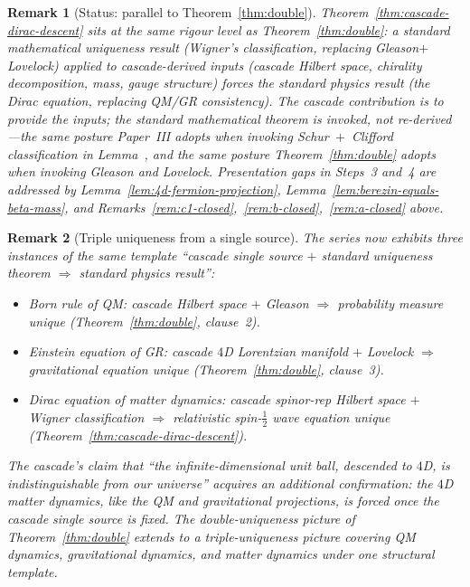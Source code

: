 \documentclass[12pt,a4paper]{article}
\newtheorem*{remark}{Remark}
\begin{document}
\begin{remark}[Status: parallel to Theorem~\ref{thm:double}]
\label{rem:cascade-dirac-status}
Theorem~\ref{thm:cascade-dirac-descent} sits at the same rigour
level as Theorem~\ref{thm:double}: a standard mathematical
uniqueness result (Wigner's classification, replacing
Gleason$+$Lovelock) applied to cascade-derived inputs (cascade
Hilbert space, chirality decomposition, mass, gauge structure)
forces the standard physics result (the Dirac equation, replacing
QM/GR consistency). The cascade contribution is to provide the
inputs; the standard mathematical theorem is invoked, not
re-derived---the same posture Paper~III adopts when invoking
Schur~$+$~Clifford classification in
Lemma~, and the same posture
Theorem~\ref{thm:double} adopts when invoking Gleason and Lovelock.
Presentation gaps in Steps~3 and~4 are addressed by
Lemma~\ref{lem:4d-fermion-projection},
Lemma~\ref{lem:berezin-equals-beta-mass}, and
Remarks~\ref{rem:c1-closed},~\ref{rem:b-closed},~\ref{rem:a-closed}
above.
\end{remark}

\begin{remark}[Triple uniqueness from a single source]
\label{rem:triple-uniqueness}
The series now exhibits three instances of the same template
``cascade single source $+$ standard uniqueness theorem
$\Rightarrow$ standard physics result'':
\begin{itemize}[nosep]
\item \emph{Born rule of QM}: cascade Hilbert space $+$ Gleason
$\Rightarrow$ probability measure unique
(Theorem~\ref{thm:double}, clause~2).
\item \emph{Einstein equation of GR}: cascade $4$D Lorentzian
manifold $+$ Lovelock $\Rightarrow$ gravitational equation unique
(Theorem~\ref{thm:double}, clause~3).
\item \emph{Dirac equation of matter dynamics}: cascade
spinor-rep Hilbert space $+$ Wigner classification $\Rightarrow$
relativistic spin-$\tfrac{1}{2}$ wave equation unique
(Theorem~\ref{thm:cascade-dirac-descent}).
\end{itemize}
The cascade's claim that ``the infinite-dimensional unit ball,
descended to $4$D, is indistinguishable from our universe''
acquires an additional confirmation: the $4$D matter dynamics,
like the QM and gravitational projections, is forced once the
cascade single source is fixed. The double-uniqueness picture of
Theorem~\ref{thm:double} extends to a triple-uniqueness picture
covering QM dynamics, gravitational dynamics, and matter dynamics
under one structural template.
\end{remark}
\end{document}
